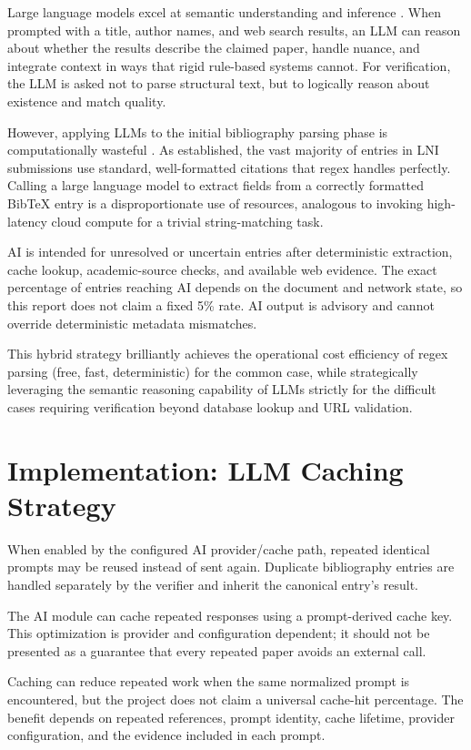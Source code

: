 \documentclass[12pt,a4paper,oneside]{report}
\begin{document}
Large language models excel at semantic understanding and inference \cite{bhoi2026}. When prompted with a title, author names, and web search results, an LLM can reason about whether the results describe the claimed paper, handle nuance, and integrate context in ways that rigid rule-based systems cannot. For verification, the LLM is asked not to parse structural text, but to logically reason about existence and match quality.

However, applying LLMs to the initial bibliography parsing phase is computationally wasteful \cite{parseur2026}. As established, the vast majority of entries in LNI submissions use standard, well-formatted citations that regex handles perfectly. Calling a large language model to extract fields from a correctly formatted BibTeX entry is a disproportionate use of resources, analogous to invoking high-latency cloud compute for a trivial string-matching task.

AI is intended for unresolved or uncertain entries after deterministic extraction, cache lookup, academic-source checks, and available web evidence. The exact percentage of entries reaching AI depends on the document and network state, so this report does not claim a fixed 5\% rate. AI output is advisory and cannot override deterministic metadata mismatches.

This hybrid strategy brilliantly achieves the operational cost efficiency of regex parsing (free, fast, deterministic) for the common case, while strategically leveraging the semantic reasoning capability of LLMs \cite{bhoi2026} strictly for the difficult cases requiring verification beyond database lookup and URL validation.

\section{Implementation: LLM Caching Strategy}

When enabled by the configured AI provider/cache path, repeated identical prompts may be reused instead of sent again. Duplicate bibliography entries are handled separately by the verifier and inherit the canonical entry's result.

The AI module can cache repeated responses using a prompt-derived cache key. This optimization is provider and configuration dependent; it should not be presented as a guarantee that every repeated paper avoids an external call.

Caching can reduce repeated work when the same normalized prompt is encountered, but the project does not claim a universal cache-hit percentage. The benefit depends on repeated references, prompt identity, cache lifetime, provider configuration, and the evidence included in each prompt.
\end{document}
